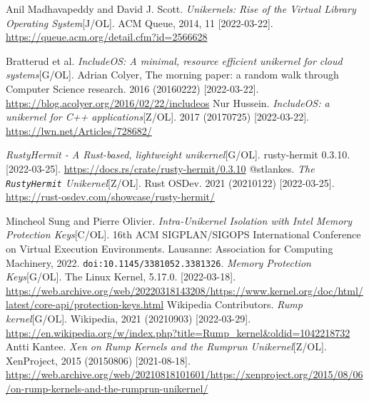 \documentclass{../runikraft-report}
\begin{document}
\begin{thebibliography}{99}
 Anil Madhavapeddy and David J. Scott. \textit{Unikernels: Rise of the Virtual Library Operating System}[J/OL]. ACM Queue, 2014, 11 [2022-03-22].  \url{https://queue.acm.org/detail.cfm?id=2566628}

  Bratterud et al. \textit{IncludeOS: A minimal, resource efficient unikernel for cloud systems}[G/OL]. Adrian Colyer, The morning paper: a random walk through Computer Science research. 2016 (20160222) [2022-03-22]. \url{https://blog.acolyer.org/2016/02/22/includeos}
 Nur Hussein. \textit{IncludeOS: a unikernel for C++ applications}[Z/OL]. 2017 (20170725) [2022-03-22]. \url{https://lwn.net/Articles/728682/}

 \textit{RustyHermit - A Rust-based, lightweight unikernel}[G/OL]. rusty-hermit 0.3.10. [2022-03-25]. \url{https://docs.rs/crate/rusty-hermit/0.3.10}
 @stlankes. \textit{The \texttt{RustyHermit} Unikernel}[Z/OL]. Rust OSDev. 2021 (20210122) [2022-03-25]. \url{https://rust-osdev.com/showcase/rusty-hermit/}

 Mincheol Sung and Pierre Olivier. \textit{Intra-Unikernel Isolation with Intel Memory Protection Keys}[C/OL]. 16th ACM SIGPLAN/SIGOPS International Conference on Virtual Execution Environments. Lausanne: Association for Computing Machinery, 2022. \texttt{doi:10.1145/3381052.3381326}.
 \textit{Memory Protection Keys}[G/OL]. The Linux Kernel, 5.17.0. [2022-03-18]. \url{https://web.archive.org/web/20220318143208/https://www.kernel.org/doc/html/latest/core-api/protection-keys.html}
 Wikipedia Contributors. \textit{Rump kernel}[G/OL]. Wikipedia, 2021 (20210903) [2022-03-29]. \url{https://en.wikipedia.org/w/index.php?title=Rump_kernel&oldid=1042218732}
 Antti Kantee. \textit{Xen on Rump Kernels and the Rumprun Unikernel}[Z/OL]. XenProject, 2015 (20150806) [2021-08-18].  \url{https://web.archive.org/web/20210818101601/https://xenproject.org/2015/08/06/on-rump-kernels-and-the-rumprun-unikernel/}


\end{thebibliography}
\end{document}
